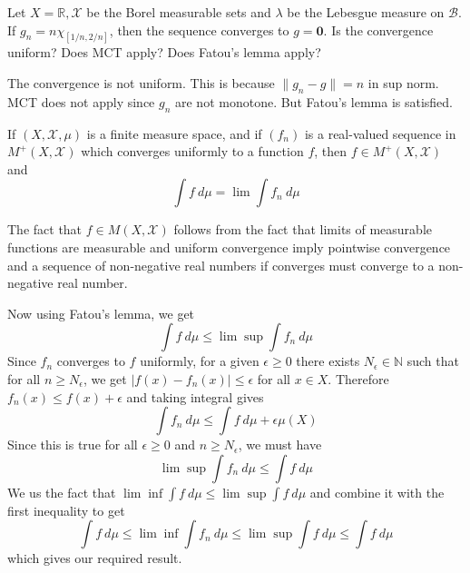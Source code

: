 \begin{exercise}[J(b)]
  Let $X=\mathbb{R}, \mathcal{X}$ be the Borel measurable sets and $\lambda$ be the Lebesgue measure on $\mathcal{B}$. If $g_n = n\chi_{[1/n,2/n]}$, then the sequence converges to $g = \textbf{0}$. Is the convergence uniform? Does MCT apply? Does Fatou's lemma apply?
\end{exercise}
\begin{solution}
  The convergence is not uniform. This is because $\|g_n - g\| = n$ in sup norm. MCT does not apply since $g_n$ are not monotone. But Fatou's lemma is satisfied.
\end{solution}
\begin{exercise}[K]
  If $(X, \mathcal{X}, \mu)$ is a finite measure space, and if $(f_n)$ is a real-valued sequence in $M^{+}(X, \mathcal{X})$ which converges uniformly to a function $f$, then $f \in M^{+}(X, \mathcal{X})$ and \[
    \int f \ d \mu = \lim \int f_n \ d \mu
  \]
\end{exercise}
\begin{solution}
  The fact that $f \in M(X, \mathcal{X})$ follows from the fact that limits of measurable functions are measurable and uniform convergence imply pointwise convergence and a sequence of non-negative real numbers if converges must converge to a non-negative real number.

  Now using Fatou's lemma, we get \[
    \int f \ d \mu \le \lim \sup \int f_n \ d \mu
  \]
  Since $f_n$ converges to $f$ uniformly, for a given $\epsilon \ge 0$ there exists $N_\epsilon \in \mathbb{N}$ such that for all $n \ge N_\epsilon$, we get $|f(x) - f_n(x)| \le \epsilon$ for all $x \in X$. Therefore $f_n(x) \le f(x) + \epsilon$ and taking integral gives \[
    \int f_n \ d \mu \le \int f \ d \mu + \epsilon \mu(X)
  \]
  Since this is true for all $\epsilon \ge 0$ and $n \ge N_\epsilon$, we must have \[
    \lim \sup \int f_n \ d \mu \le \int f \ d \mu
  \]
  We us the fact that $\lim \inf \int f \ d \mu \le \lim \sup \int f \ d \mu$ and combine it with the first inequality to get
  \[
       \int f \ d \mu \le \lim \inf \int f_n \ d \mu \le \lim \sup \int f \ d \mu \le \int f \ d \mu
  \]
  which gives our required result.
 \end{solution}

